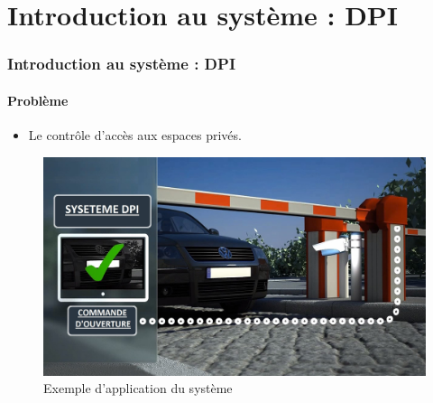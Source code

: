
\section{Introduction au système : DPI}
\begin{frame}
\frametitle{Introduction au système : DPI}
\framesubtitle{Problème}

\begin{itemize}
	\item	<1->	Le contrôle d'accès aux espaces privés.
\end{itemize}

\begin{figure}
\begin{overprint}
	\centering\includegraphics[width=0.7\linewidth]{figures/DPI.PNG}\caption{Exemple d'application du système}
\end{overprint}
\end{figure}
	
\end{frame}


